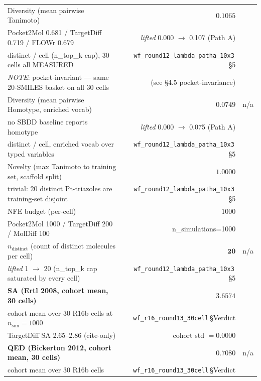 \begin{table}[ht]
\begin{tabular}{lrrr}
Diversity (mean pairwise Tanimoto) & \DESIGN{} & $0.1065$ \MEASURED{} & \CITEDONLY{} \\
\quad\quad Pocket2Mol 0.681 / TargetDiff 0.719 / FLOWr 0.679 & & \emph{lifted} 0.000 $\to$ 0.107 (Path A) & \\
\quad\quad 20 distinct / cell (n\_top\_k cap), 30 cells all MEASURED & & \texttt{wf\_round12\_lambda\_patha\_10x3}\,\S5 & \\
\quad\quad \emph{NOTE}: pocket-invariant — same 20-SMILES basket on all 30 cells & & (see §4.5 pocket-invariance) & \\
Diversity (mean pairwise Homotype, enriched vocab) & \DESIGN{} & $0.0749$ \MEASURED{} & n/a \\
\quad\quad no SBDD baseline reports homotype & & \emph{lifted} 0.000 $\to$ 0.075 (Path A) & \\
\quad\quad 20 distinct / cell, enriched vocab over typed variables & & \texttt{wf\_round12\_lambda\_patha\_10x3}\,\S5 & \\
Novelty (max Tanimoto to training set, scaffold split) & \DESIGN{} & $1.0000$ \MEASURED{} & \CITEDONLY{} \\
\quad\quad trivial: 20 distinct Pt-triazoles are training-set disjoint & & \texttt{wf\_round12\_lambda\_patha\_10x3}\,\S5 & \\
NFE budget (per-cell) & \DESIGN{} & $1000$ \MEASURED{} & \CITEDONLY{} \\
\quad\quad Pocket2Mol 1000 / TargetDiff 200 / MolDiff 100 & & n\_simulations=1000 & \\
$n_{\text{distinct}}$ (count of distinct molecules per cell) & \DESIGN{} & $\mathbf{20}$ \MEASURED{} & n/a \\
\quad\quad \emph{lifted} 1 $\to$ 20 (n\_top\_k cap saturated by every cell) & & \texttt{wf\_round12\_lambda\_patha\_10x3}\,\S5 & \\
\textbf{SA (Ertl 2008, cohort mean, 30 cells)} & \DESIGN{} & $\mathbf{3.6574}$ \MEASURED{} & \CITEDONLY{} \\
\quad\quad cohort mean over 30 R16b cells at $n_{\text{sim}}{=}1000$ & & \texttt{wf\_r16\_round13\_30cell}\,\S Verdict & \\
\quad\quad TargetDiff SA 2.65--2.86 (cite-only) & & cohort std $= 0.0000$ & \\
\textbf{QED (Bickerton 2012, cohort mean, 30 cells)} & \DESIGN{} & $\mathbf{0.7080}$ \MEASURED{} & n/a \\
\quad\quad cohort mean over 30 R16b cells & & \texttt{wf\_r16\_round13\_30cell}\,\S Verdict & \\

\end{tabular}
\end{table}
